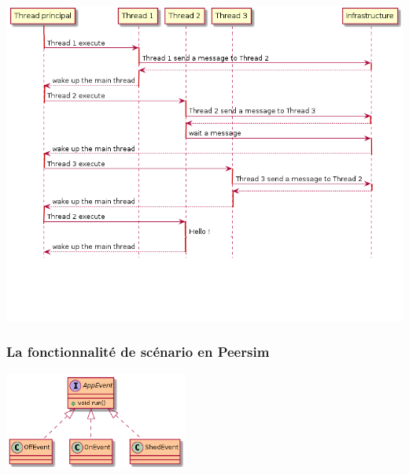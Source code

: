 \documentclass{article}
\begin{document}
	\vspace{10mm}
	\hspace*{-0.7cm} \includegraphics[width=17cm]{uml/diagseq.png}
	\newpage
						\subsubsection{La fonctionnalité de scénario en Peersim}
						\vspace{5mm}
						\hspace*{5cm} \includegraphics[width=60mm]{uml/scenPuml.png}
						
\end{document}
